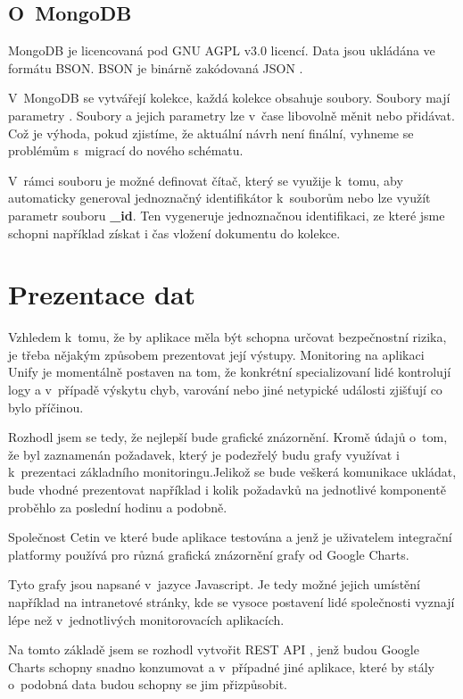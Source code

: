 \documentclass[thesis=M,czech]{FITthesis}[2012/10/20]
\begin{document}
		\subsection{O~MongoDB}
			MongoDB je licencovaná pod  GNU AGPL v3.0 \cite{mongo_gnu} licencí. Data jsou ukládána ve formátu BSON. BSON je binárně zakódovaná JSON \cite{bsonspec.org}.

			V~MongoDB se vytvářejí kolekce, každá kolekce obsahuje soubory. Soubory mají parametry \cite{mongoDB}. Soubory a jejich parametry lze v~čase libovolně měnit nebo přidávat. Což je výhoda, pokud zjistíme, že aktuální návrh není finální, vyhneme se problémům s~migrací do nového schématu.

			V~rámci souboru je možné definovat čítač, který se využije k~tomu, aby automaticky generoval jednoznačný identifikátor k~souborům nebo lze využít parametr souboru \textbf{\_id}. Ten vygeneruje jednoznačnou identifikaci, ze které jsme schopni například získat i čas vložení dokumentu do kolekce. 

		
	\section{Prezentace dat}
		\label{sec:data_prezentation}
		Vzhledem k~tomu, že by aplikace měla být schopna určovat bezpečnostní rizika, je třeba nějakým způsobem prezentovat její výstupy. Monitoring na aplikaci Unify je momentálně postaven na tom, že konkrétní specializovaní lidé kontrolují logy a v~případě výskytu chyb, varování nebo jiné netypické události zjišťují co bylo příčinou.
		
		Rozhodl jsem se tedy, že nejlepší bude grafické znázornění. Kromě údajů o~tom, že byl zaznamenán požadavek, který je podezřelý budu grafy využívat i k~prezentaci základního monitoringu.Jelikož se bude veškerá komunikace ukládat, bude vhodné prezentovat například i kolik požadavků na jednotlivé komponentě proběhlo za poslední hodinu a podobně.
		
		Společnost Cetin \cite{cetin} ve které bude aplikace testována a jenž je uživatelem integrační platformy používá pro různá grafická znázornění grafy od Google Charts\cite{googleCharts}. 
		
		Tyto grafy jsou napsané v~jazyce Javascript. Je tedy možné jejich umístění například na intranetové stránky, kde se vysoce postavení lidé společnosti vyznají lépe než v~jednotlivých monitorovacích aplikacích.
		
		Na tomto základě jsem se rozhodl vytvořit REST API \cite{rest}, jenž budou Google Charts schopny snadno konzumovat a v~případné jiné aplikace, které by stály o~podobná data budou schopny se jim přizpůsobit.
		
\end{document}
